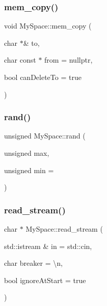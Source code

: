 \subsubsection{\texorpdfstring{mem\+\_\+copy()}{mem\_copy()}}
{\footnotesize\ttfamily void My\+Space\+::mem\+\_\+copy (\begin{DoxyParamCaption}\item[{char $\ast$\&}]{to,  }\item[{char const $\ast$}]{from = {\ttfamily nullptr},  }\item[{bool}]{can\+Delete\+To = {\ttfamily true} }\end{DoxyParamCaption})}

\mbox{\label{namespaceMySpace_af98f3ea3e2a0dbabf65f65c74c015830}} 
\subsubsection{\texorpdfstring{rand()}{rand()}}
{\footnotesize\ttfamily unsigned My\+Space\+::rand (\begin{DoxyParamCaption}\item[{unsigned}]{max,  }\item[{unsigned}]{min = {} }\end{DoxyParamCaption})}

\mbox{\label{namespaceMySpace_acfe71ee08c30cdafde43d7db1cd34aff}} 
\subsubsection{\texorpdfstring{read\+\_\+stream()}{read\_stream()}}
{\footnotesize\ttfamily char $\ast$ My\+Space\+::read\+\_\+stream (\begin{DoxyParamCaption}\item[{std\+::istream \&}]{in = {\ttfamily std\+:\+:cin},  }\item[{char}]{breaker = {\ttfamily \textquotesingle{}\textbackslash{}n\textquotesingle{}},  }\item[{bool}]{ignore\+At\+Start = {\ttfamily true} }\end{DoxyParamCaption})}

\mbox{\label{namespaceMySpace_ad2ec85a91c9b7fb281271a88f0ce9ef4}} 
